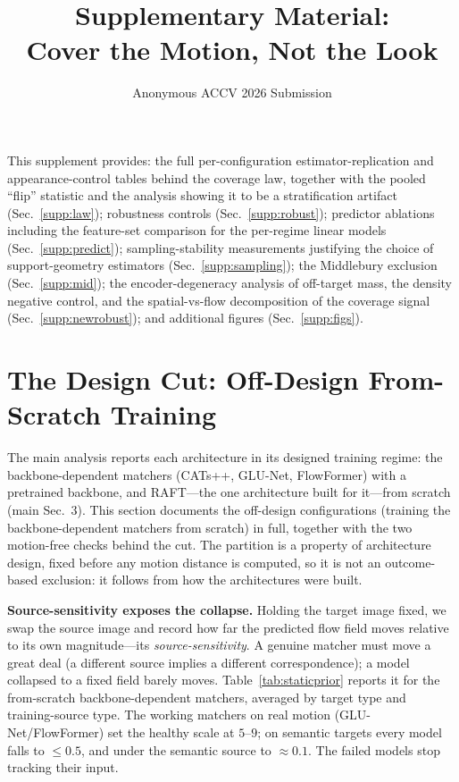 \documentclass[runningheads]{llncs}
\begin{document}
\title{Supplementary Material:\\Cover the Motion, Not the Look}
\author{Anonymous ACCV 2026 Submission}
\maketitle

\noindent This supplement provides: the full per-configuration
estimator-replication and appearance-control tables behind the coverage law,
together with the pooled ``flip'' statistic and the analysis showing it to be a
stratification artifact (Sec.~\ref{supp:law}); robustness controls
(Sec.~\ref{supp:robust}); predictor ablations including the feature-set
comparison for the per-regime linear models (Sec.~\ref{supp:predict});
sampling-stability measurements justifying the choice of support-geometry
estimators (Sec.~\ref{supp:sampling}); the Middlebury exclusion
(Sec.~\ref{supp:mid}); the encoder-degeneracy analysis of off-target mass, the density
negative control, and the spatial-vs-flow decomposition of the coverage signal
(Sec.~\ref{supp:newrobust}); and additional figures (Sec.~\ref{supp:figs}).

\section{The Design Cut: Off-Design From-Scratch Training}
\label{supp:designcut}

The main analysis reports each architecture in its designed training regime: the
backbone-dependent matchers (CATs++, GLU-Net, FlowFormer) with a pretrained
backbone, and RAFT---the one architecture built for it---from scratch
(main Sec.~3). This section documents the off-design configurations (training the
backbone-dependent matchers from scratch) in full, together with the two
motion-free checks behind the cut. The partition is a property of architecture
design, fixed before any motion distance is computed, so it is not an
outcome-based exclusion: it follows from how the architectures were built.

\noindent\textbf{Source-sensitivity exposes the collapse.} Holding the target
image fixed, we swap the source image and record how far the predicted flow field
moves relative to its own magnitude---its \emph{source-sensitivity}. A genuine
matcher must move a great deal (a different source implies a different
correspondence); a model collapsed to a fixed field barely moves.
Table~\ref{tab:staticprior} reports it for the from-scratch backbone-dependent
matchers, averaged by target type and training-source type. The working matchers
on real motion (GLU-Net/FlowFormer) set the healthy scale at $5$--$9$; on semantic
targets every model falls to $\le0.5$, and under the semantic source to
${\approx}0.1$. The failed models stop tracking their input.
\end{document}
